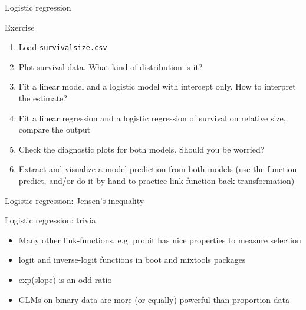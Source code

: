 \documentclass[10pt]{beamer}\usepackage[]{graphicx}\usepackage[]{color}
\begin{document}
\begin{frame}[fragile]{Logistic regression}
  




  \begin{exampleblock}{Exercise}
    \begin{enumerate}
      \item Load \texttt{survivalsize.csv}
      \item Plot survival data. What kind of distribution is it?
      \item Fit a linear model and a logistic model with intercept only. How to interpret the estimate?
      \item Fit a linear regression and a logistic regression of survival on relative size, compare the output
      \item Check the diagnostic plots for both models. Should you be worried?
      \item Extract and visualize a model prediction from both models (use the function predict, and/or do it by hand to practice link-function back-transformation)
    \end{enumerate}
  \end{exampleblock}


\end{frame}

\begin{frame}{Logistic regression: Jensen's inequality}
\end{frame}

\begin{frame}{Logistic regression: trivia}

  \begin{itemize}[<+->]
    \item Many other link-functions, e.g. probit has nice properties to measure selection
    \item logit and inverse-logit functions in boot and mixtools packages
    \item exp(slope) is an odd-ratio 
    \item GLMs on binary data are more (or equally) powerful than proportion data
  \end{itemize}
\end{frame}
\end{document}
